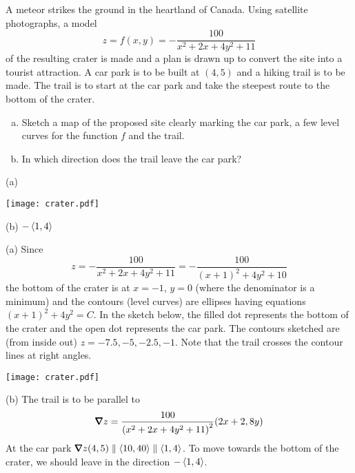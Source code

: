 \begin{question}[M200 2004A] %
A meteor strikes the ground in the heartland of Canada. 
Using satellite photographs, a model
\begin{equation*}
z=f(x,y)=-\frac{100}{x^2+2x+4y^2+11}
\end{equation*}
of the resulting crater is made and a plan is drawn up to convert the site into
a tourist attraction. A car park is to be built at  $(4,5)$ and a hiking trail is to be made. The trail is to start at the car park and take the steepest route to the bottom of the crater.
\begin{enumerate}[(a)]
\item
  Sketch a map of the proposed site clearly marking the car park, 
a few level curves for the function $f$  and the trail.

\item  
In which direction does the trail leave the car park? 
\end{enumerate}
\end{question}

%

\begin{answer}
(a) \begin{center}
     \texttt{[image: crater.pdf]}
\end{center}

(b) $-\left< 1,4\right>$

\end{answer}

\begin{solution}
(a)  Since
\begin{equation*}
z=-\frac{100}{x^2+2x+4y^2+11}=-\frac{100}{(x+1)^2+4y^2+10}
\end{equation*}
the bottom of the crater is at $x=-1$, $y=0$ (where the denominator is
a minimum) and the contours (level curves) are ellipses having equations
$(x+1)^2+4y^2=C$. In the sketch below, the filled dot represents the 
bottom of the crater and the open dot represents the car park. The 
contours sketched are (from inside out) $z=-7.5, -5, -2.5, -1$. Note that
the trail crosses the contour lines at right angles.

\begin{center}
     \texttt{[image: crater.pdf]}
\end{center}

(b) The trail is to be parallel to 
$$
\vnabla z = \frac{100}{{(x^2+2x+4y^2+11)}^2}(2x+2,8y)
$$
At the car park $\vnabla z(4,5)\parallel \llt 10, 40\rgt\parallel \llt 1,4\rgt$.
To move towards the bottom of the crater, we should leave in the direction  
$-\left< 1,4\right>$.
\end{solution}

